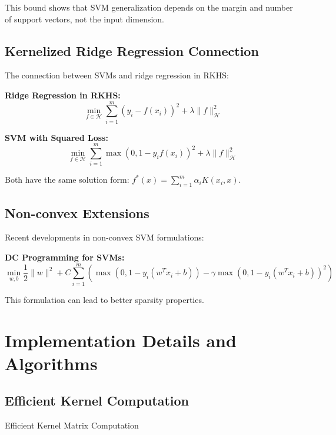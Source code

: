 \documentclass[12pt, a4paper]{article}
\begin{document}
This bound shows that SVM generalization depends on the margin and number of support vectors, not the input dimension.

\subsection{Kernelized Ridge Regression Connection}

The connection between SVMs and ridge regression in RKHS:

\textbf{Ridge Regression in RKHS:}
\begin{equation}
\min_{f \in \mathcal{H}} \sum_{i=1}^m (y_i - f(x_i))^2 + \lambda \|f\|_{\mathcal{H}}^2
\end{equation}

\textbf{SVM with Squared Loss:}
\begin{equation}
\min_{f \in \mathcal{H}} \sum_{i=1}^m \max(0, 1-y_i f(x_i))^2 + \lambda \|f\|_{\mathcal{H}}^2
\end{equation}

Both have the same solution form: $f^*(x) = \sum_{i=1}^m \alpha_i K(x_i, x)$.

\subsection{Non-convex Extensions}

Recent developments in non-convex SVM formulations:

\textbf{DC Programming for SVMs:}
\begin{equation}
\min_{w,b} \frac{1}{2}\|w\|^2 + C\sum_{i=1}^m (\max(0, 1-y_i(w^T x_i + b)) - \gamma \max(0, 1-y_i(w^T x_i + b))^2)
\end{equation}

This formulation can lead to better sparsity properties.

\section{Implementation Details and Algorithms}

\subsection{Efficient Kernel Computation}

\begin{algorithm}[H]
\SetAlgoLined
{}
\caption{Efficient Kernel Matrix Computation}
\end{algorithm}
\end{document}
